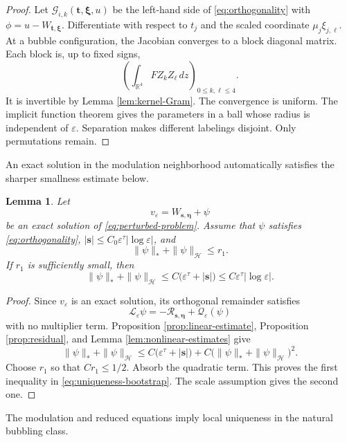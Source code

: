 \documentclass[11pt]{article}
\newtheorem{lemma}[theorem]{Lemma}
\numberwithin{equation}{section}
\begin{document}
\begin{proof}
Let $\mathcal G_{i,k}(\boldsymbol t,\boldsymbol\xi,u)$ be the left-hand side of
\eqref{eq:orthogonality} with
$\phi=u-W_{\boldsymbol t,\boldsymbol\xi}$. Differentiate with respect to $t_j$ and the scaled coordinate
$\mu_j\xi_{j,\ell}$. At a bubble configuration, the Jacobian converges to a block diagonal matrix. Each block is, up to fixed signs,
\[
\left(\int_{\mathbb R^4}FZ_kZ_\ell\,dz\right)_{0\leq k,\ell\leq4}.
\]
It is invertible by Lemma \ref{lem:kernel-Gram}. The convergence is uniform. The implicit function theorem gives the parameters in a ball whose radius is independent of $\varepsilon$. Separation makes different labelings disjoint. Only permutations remain.
\end{proof}

An exact solution in the modulation neighborhood automatically satisfies the sharper smallness estimate below.

\begin{lemma}\label{lem:uniqueness-bootstrap}
Let
\[
v_\varepsilon
=W_{\boldsymbol s,\boldsymbol\eta}+\psi
\]
be an exact solution of \eqref{eq:perturbed-problem}. Assume that
$\psi$ satisfies \eqref{eq:orthogonality},
$|\boldsymbol s|\leq
C_0\varepsilon^\tau|\log\varepsilon|$, and
\[
\|\psi\|_*+\|\psi\|_{\mathcal H}\leq r_1.
\]
If $r_1$ is sufficiently small, then
\begin{equation}\label{eq:uniqueness-bootstrap}
\|\psi\|_*+\|\psi\|_{\mathcal H}
\leq
C\bigl(\varepsilon^\tau+|\boldsymbol s|\bigr)
\leq C\varepsilon^\tau|\log\varepsilon|.
\end{equation}
\end{lemma}

\begin{proof}
Since $v_\varepsilon$ is an exact solution, its orthogonal remainder
satisfies
\[
\mathcal L_\varepsilon\psi
=-\mathcal R_{\boldsymbol s,\boldsymbol\eta}
+\mathcal Q_\varepsilon(\psi)
\]
with no multiplier term. Proposition \ref{prop:linear-estimate},
Proposition \ref{prop:residual}, and Lemma
\ref{lem:nonlinear-estimates} give
\[
\|\psi\|_*+\|\psi\|_{\mathcal H}
\leq
C\bigl(\varepsilon^\tau+|\boldsymbol s|\bigr)
+C\bigl(\|\psi\|_*+\|\psi\|_{\mathcal H}\bigr)^2.
\]
Choose $r_1$ so that $Cr_1\leq1/2$. Absorb the quadratic term.
This proves the first inequality in
\eqref{eq:uniqueness-bootstrap}. The scale assumption gives the
second one.
\end{proof}

The modulation and reduced equations imply local uniqueness in the natural bubbling class.
\end{document}
